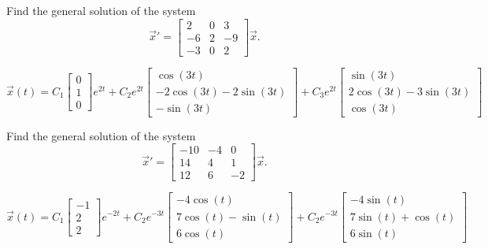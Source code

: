 \begin{exercise}%
Find the general solution of the system
\begin{equation*}
{\vec{x}}' = \begin{bmatrix} 2 & 0 & 3 \\ -6 & 2 & -9 \\ -3 & 0 & 2 \end{bmatrix} \vec{x}.
\end{equation*}
\end{exercise}
\comboSol{%
}
{%
$\vec{x}(t) = C_1\left[\begin{smallmatrix} 0 \\ 1 \\ 0 \end{smallmatrix}\right]e^{2t} + C_2e^{2t}\left[\begin{smallmatrix} \cos(3t) \\ -2\cos(3t) - 2\sin(3t)\\ -\sin(3t) \end{smallmatrix}\right] + C_3e^{2t}\left[\begin{smallmatrix} \sin(3t) \\ 2\cos(3t) - 3\sin(3t) \\ \cos(3t) \end{smallmatrix}\right]$
}

\begin{exercise}%
Find the general solution of the system
\begin{equation*}
{\vec{x}}' = \begin{bmatrix} -10 & -4 & 0 \\ 14 & 4 & 1 \\ 12 & 6 & -2 \end{bmatrix} \vec{x}.
\end{equation*}
\end{exercise}
\comboSol{%
}
{%
$\vec{x}(t) = C_1\left[\begin{smallmatrix} -1 \\ 2 \\ 2 \end{smallmatrix}\right]e^{-2t} + C_2e^{-3t} \left[\begin{smallmatrix} -4\cos(t) \\ 7\cos(t) - \sin(t) \\ 6\cos(t)  \end{smallmatrix}\right] + C_2e^{-3t}\left[\begin{smallmatrix} -4\sin(t) \\ 7\sin(t) + \cos(t) \\ 6\sin(t) \end{smallmatrix}\right]$
}

